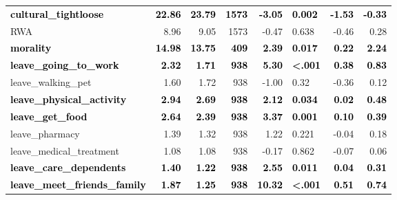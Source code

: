 \documentclass[]{article}
\begin{document}
\begin{table}[H]
\begin{tabular}[t]{lrrrrlrr}
\textcolor{black}{\textbf{cultural\_tightloose}} & \textcolor{black}{\textbf{22.86}} & \textcolor{black}{\textbf{23.79}} & \textcolor{black}{\textbf{1573}} & \textcolor{black}{\textbf{-3.05}} & \textcolor{black}{\textbf{0.002}} & \textcolor{black}{\textbf{-1.53}} & \textcolor{black}{\textbf{-0.33}}\\
RWA & 8.96 & 9.05 & 1573 & -0.47 & 0.638 & -0.46 & 0.28\\
\textcolor{black}{\textbf{morality}} & \textcolor{black}{\textbf{14.98}} & \textcolor{black}{\textbf{13.75}} & \textcolor{black}{\textbf{409}} & \textcolor{black}{\textbf{2.39}} & \textcolor{black}{\textbf{0.017}} & \textcolor{black}{\textbf{0.22}} & \textcolor{black}{\textbf{2.24}}\\
\addlinespace
\textcolor{black}{\textbf{leave\_going\_to\_work}} & \textcolor{black}{\textbf{2.32}} & \textcolor{black}{\textbf{1.71}} & \textcolor{black}{\textbf{938}} & \textcolor{black}{\textbf{5.30}} & \textcolor{black}{\textbf{<.001}} & \textcolor{black}{\textbf{0.38}} & \textcolor{black}{\textbf{0.83}}\\
leave\_walking\_pet & 1.60 & 1.72 & 938 & -1.00 & 0.32 & -0.36 & 0.12\\
\textcolor{black}{\textbf{leave\_physical\_activity}} & \textcolor{black}{\textbf{2.94}} & \textcolor{black}{\textbf{2.69}} & \textcolor{black}{\textbf{938}} & \textcolor{black}{\textbf{2.12}} & \textcolor{black}{\textbf{0.034}} & \textcolor{black}{\textbf{0.02}} & \textcolor{black}{\textbf{0.48}}\\
\textcolor{black}{\textbf{leave\_get\_food}} & \textcolor{black}{\textbf{2.64}} & \textcolor{black}{\textbf{2.39}} & \textcolor{black}{\textbf{938}} & \textcolor{black}{\textbf{3.37}} & \textcolor{black}{\textbf{0.001}} & \textcolor{black}{\textbf{0.10}} & \textcolor{black}{\textbf{0.39}}\\
leave\_pharmacy & 1.39 & 1.32 & 938 & 1.22 & 0.221 & -0.04 & 0.18\\
\addlinespace
leave\_medical\_treatment & 1.08 & 1.08 & 938 & -0.17 & 0.862 & -0.07 & 0.06\\
\textcolor{black}{\textbf{leave\_care\_dependents}} & \textcolor{black}{\textbf{1.40}} & \textcolor{black}{\textbf{1.22}} & \textcolor{black}{\textbf{938}} & \textcolor{black}{\textbf{2.55}} & \textcolor{black}{\textbf{0.011}} & \textcolor{black}{\textbf{0.04}} & \textcolor{black}{\textbf{0.31}}\\
\textcolor{black}{\textbf{leave\_meet\_friends\_family}} & \textcolor{black}{\textbf{1.87}} & \textcolor{black}{\textbf{1.25}} & \textcolor{black}{\textbf{938}} & \textcolor{black}{\textbf{10.32}} & \textcolor{black}{\textbf{<.001}} & \textcolor{black}{\textbf{0.51}} & \textcolor{black}{\textbf{0.74}}\\

\end{tabular}
\end{table}
\end{document}
